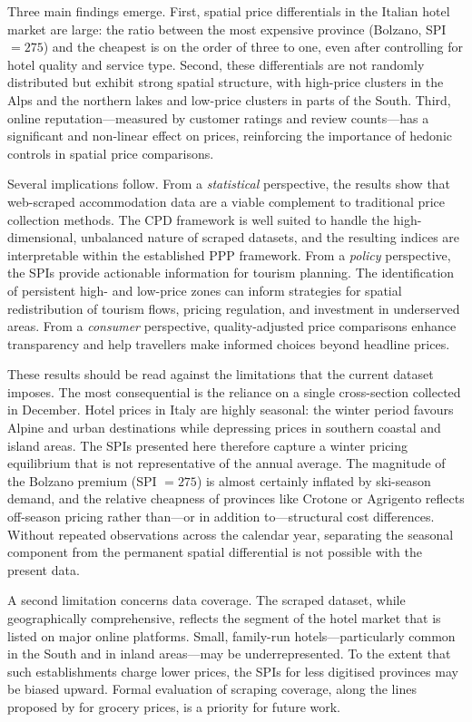 \documentclass[12pt,a4paper]{article}
\begin{document}
Three main findings emerge. First, spatial price differentials in the Italian hotel market are large: the ratio between the most expensive province (Bolzano, SPI $= 275$) and the cheapest is on the order of three to one, even after controlling for hotel quality and service type. Second, these differentials are not randomly distributed but exhibit strong spatial structure, with high-price clusters in the Alps and the northern lakes and low-price clusters in parts of the South. Third, online reputation---measured by customer ratings and review counts---has a significant and non-linear effect on prices, reinforcing the importance of hedonic controls in spatial price comparisons.

Several implications follow. From a \textit{statistical} perspective, the results show that web-scraped accommodation data are a viable complement to traditional price collection methods. The CPD framework is well suited to handle the high-dimensional, unbalanced nature of scraped datasets, and the resulting indices are interpretable within the established PPP framework. From a \textit{policy} perspective, the SPIs provide actionable information for tourism planning. The identification of persistent high- and low-price zones can inform strategies for spatial redistribution of tourism flows, pricing regulation, and investment in underserved areas. From a \textit{consumer} perspective, quality-adjusted price comparisons enhance transparency and help travellers make informed choices beyond headline prices.

These results should be read against the limitations that the current dataset imposes. The most consequential is the reliance on a single cross-section collected in December. Hotel prices in Italy are highly seasonal: the winter period favours Alpine and urban destinations while depressing prices in southern coastal and island areas. The SPIs presented here therefore capture a winter pricing equilibrium that is not representative of the annual average. The magnitude of the Bolzano premium (SPI $= 275$) is almost certainly inflated by ski-season demand, and the relative cheapness of provinces like Crotone or Agrigento reflects off-season pricing rather than---or in addition to---structural cost differences. Without repeated observations across the calendar year, separating the seasonal component from the permanent spatial differential is not possible with the present data.

A second limitation concerns data coverage. The scraped dataset, while geographically comprehensive, reflects the segment of the hotel market that is listed on major online platforms. Small, family-run hotels---particularly common in the South and in inland areas---may be underrepresented. To the extent that such establishments charge lower prices, the SPIs for less digitised provinces may be biased upward. Formal evaluation of scraping coverage, along the lines proposed by \citet{palumbo2023coverage} for grocery prices, is a priority for future work.
\end{document}
